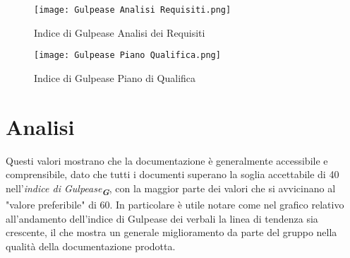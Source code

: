 \begin{figure}[H]
    \centering

    \begin{minipage}{.4\textwidth}
        \centering
        \texttt{[image: Gulpease Analisi Requisiti.png]}
        \caption{Indice di Gulpease Analisi dei Requisiti}
        \label{fig:Gulpease Analisi Requisiti}
    \end{minipage}%
    \hfill
    \begin{minipage}{.4\textwidth}
        \centering
        \texttt{[image: Gulpease Piano Qualifica.png]}
        \caption{Indice di Gulpease Piano di Qualifica}
        \label{fig:Gulpease Piano Qualifica}
    \end{minipage}

\end{figure}


\section*{Analisi}

Questi valori mostrano che la documentazione è generalmente accessibile e comprensibile, 
dato che tutti i documenti superano la soglia accettabile di 40 nell'\emph{indice di Gulpease}\textsubscript{\textbf{\textit{G}}}, 
con la maggior parte dei valori che si avvicinano al "valore preferibile" di 60. 
In particolare è utile notare come nel grafico relativo all'andamento dell'indice di Gulpease dei verbali la linea di tendenza sia crescente,
il che mostra un generale miglioramento da parte del gruppo nella qualità della documentazione prodotta.